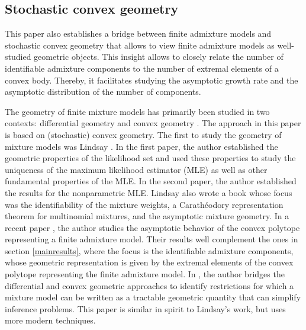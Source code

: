 \documentclass[12pt, reqno]{amsart}
\theoremstyle{definition}
\begin{document}
\subsection{Stochastic convex geometry}
This paper also establishes a bridge between finite admixture models and stochastic convex geometry that allows to view finite admixture models as well-studied geometric objects. This insight allows to closely relate the number of identifiable admixture components to the number of extremal elements of a convex body. Thereby, it facilitates studying the asymptotic growth rate and the asymptotic distribution of the number of components. 

The geometry of finite mixture models has primarily been studied in two contexts: differential geometry \cite{amari,kass_vos} and convex geometry \cite{lindsay,marriott}. The approach in this paper is based on (stochastic) convex geometry. The first to study the geometry of mixture models was Lindsay \cite{lindsay_classic1,lindsay_classic2}. In the first paper, the author  established the geometric properties of the likelihood set and used these properties to study the uniqueness of the maximum likelihood estimator (MLE) as well as other fundamental properties of the MLE. In the second paper, the author established the results for the nonparametric MLE. Lindsay also wrote a book \cite{lindsay}  
whose focus was the identifiability of the mixture weights, a Carath\'eodory representation theorem for multinomial mixtures, and the asymptotic mixture geometry. In a recent paper \cite{nguyen}, the author studies the asymptotic behavior of the convex polytope representing a finite admixture model. Their results well complement the ones in section \ref{mainresults}, where the focus is the identifiable admixture components, whose geometric representation is given by the extremal elements of the convex polytope representing the finite admixture model. In \cite{marriott}, the author bridges the differential and convex geometric approaches to identify restrictions for which a mixture model can be written as a tractable geometric quantity that can simplify inference problems. This paper is similar in spirit to Lindsay's work, but uses more modern techniques.
\end{document}
